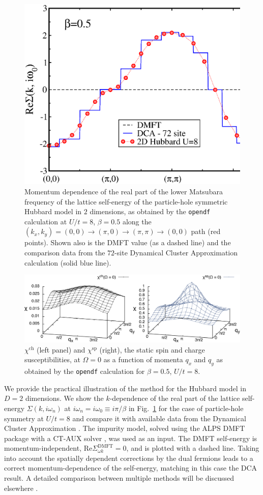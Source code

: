 \documentclass[3p,times,procedia]{elsarticle}
\begin{document}
\begin{figure}[ht]
\centering
\includegraphics[width=0.6\columnwidth]{DF_U12.eps}
\caption{Momentum dependence of the real part of the lower Matsubara frequency of the lattice self-energy of the particle-hole symmetric Hubbard model in $2$ dimensions, as obtained by the \texttt{opendf} calculation at $U/t = 8$, $\beta = 0.5$ along the $(k_x,k_y) = (0,0)\to(\pi,0)\to(\pi,\pi)\to(0,0)$ path (red points). Shown also is the DMFT value (as a dashed line) and the comparison data from the $72$-site Dynamical Cluster Approximation calculation (solid blue line).}
\label{fig:sigma}
\end{figure}

\begin{figure}[ht]
\centering
\includegraphics[width=\columnwidth]{susc.pdf}
\caption{$\chi^{\mathrm{ch}}$ (left panel) and $\chi^{\mathrm{sp}}$ (right), the static spin and charge susceptibilities, at $\Omega = 0$ as a function of momenta $q_x$ and $q_y$ as obtained by the \texttt{opendf} calculation for $\beta = 0.5$, $U/t = 8$. }
\label{fig:susc}
\end{figure}

We provide the practical illustration of the method for the Hubbard model in $D=2$ dimensions. We show the $k$-dependence of the real part of the lattice self-energy $\Sigma(k, i\omega_n)$ at $i\omega_n=i\omega_0 \equiv i\pi/\beta$ in Fig.~\ref{fig:sigma} for the case of particle-hole symmetry at $U/t=8$ and compare it with available data from the Dynamical Cluster Approximation \cite{MaierJarrell:2005}. The impurity model, solved using the ALPS DMFT \cite{ALPSDMFT} package with a CT-AUX solver \cite{Gull2008b}, was used as an input. The DMFT self-energy is momentum-independent, $\mathrm{Re} \Sigma_{\omega k}^{\mathrm{DMFT}} = 0$, and is plotted with a dashed line. Taking into account the spatially dependent corrections by the dual fermions leads to a correct momentum-dependence of the self-energy, matching in this case the DCA result. A detailed comparison between multiple methods will be discussed elsewhere \cite{LeBlanc2015}. 
\end{document}
